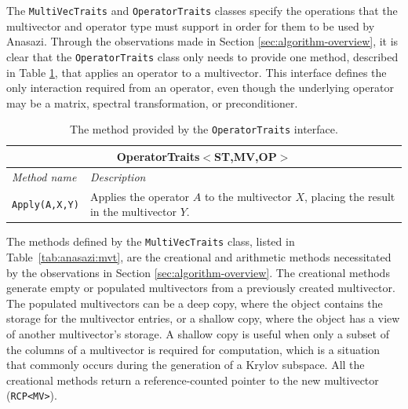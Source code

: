 \documentclass[acmtoms]{acmtrans2m}
\newcounter{algorithm}
\newcommand{\aspace}[1]{\texttt{#1}}
\begin{document}
The \aspace{MultiVecTraits} and \aspace{OperatorTraits} classes specify
the operations that the multivector and operator type must support in order for them to be
used by Anasazi. Through the observations made in Section \ref{sec:algorithm-overview}, 
it is clear that the \aspace{OperatorTraits} class only needs to provide one method,
described in Table \ref{tab:anasazi:opt}, that applies an operator to a multivector.  
This interface defines the only interaction required from an operator, even though
the underlying operator may be a matrix, 
spectral transformation, or preconditioner.
\begin{table}[bth]
\begin{center}
  \caption{The method provided by the \aspace{OperatorTraits} interface.}
\label{tab:anasazi:opt}
\begin{tabular}{| p{4cm} | p{8cm} |}
\hline
\multicolumn{2}{|c|}{\textbf{OperatorTraits$<$ST,MV,OP$>$}} \\\hline
\emph{Method name} & \emph{Description} \\\hline
{\tt Apply(A,X,Y)} & Applies the operator $A$ to the multivector $X$, placing the
result in the multivector $Y$. \\
\hline
\end{tabular}
\end{center}
\end{table}

The methods defined by the \aspace{MultiVecTraits} class, listed in
Table~\ref{tab:anasazi:mvt}, are the creational and arithmetic methods necessitated
by the observations in Section \ref{sec:algorithm-overview}.
The creational methods generate empty or populated multivectors from a previously
created multivector. The populated multivectors can be 
a deep copy, where the object contains the storage for the multivector entries, or a shallow copy, 
where the object has a view of another multivector's storage.
A shallow copy is useful when only a
subset of the columns of a multivector is required for computation, which is a situation that 
commonly occurs during the generation of a Krylov subspace. All the creational methods return
a reference-counted pointer \cite{Detlefs:1992:GCR,Teuchos-RCP} to the new multivector (\aspace{RCP<MV>}). 

\end{document}
